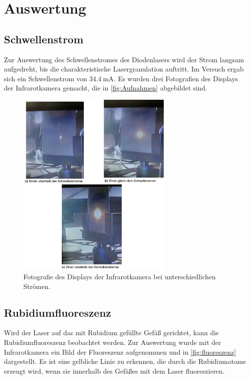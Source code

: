 \section{Auswertung}
\label{sec:Auswertung}

\subsection{Schwellenstrom}
\label{subsec:Schwellenstrom}
Zur Auswertung des Schwellenstromes des Diodenlasers wird der Strom langsam aufgedreht, bis die charakteristische Lasergranulation auftritt. Im Versuch
ergab sich ein Schwellenstrom von $\SI{34,4}{\milli\ampere}$. \newline
Es wurden drei Fotografien des Displays der Infrarotkamera gemacht, die in \autoref{fig:Aufnahmen} abgebildet sind.

\begin{figure}[H]
  \centering
  \includegraphics[width=0.68\textwidth]{data/Aufnahmen.png}
  \caption{Fotografie des Displays der Infrarotkamera bei unterschiedlichen Strömen.}
  \label{fig:Aufnahmen}
\end{figure}

\subsection{Rubidiumfluoreszenz}
\label{subsec:Rubidiumfluoreszenz}

Wird der Laser auf das mit Rubidium gefüllte Gefäß gerichtet, kann die Rubidiumfluoreszenz beobachtet werden. Zur Auswertung wurde mit der Infrarotkamera ein Bild der Fluoreszenz aufgenommen und
in \autoref{fig:fluoreszenz} dargestellt. Es ist eine gelbliche Linie zu erkennen, die durch die Rubidiumatome erzeugt wird, wenn sie innerhalb des Gefäßes mit dem Laser fluoreszieren.

